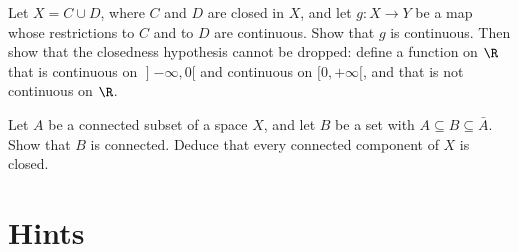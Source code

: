 \begin{exercise}[$\star\star$]\label{ex:v7c03c}
Let $X=C\cup D$, where $C$ and $D$ are closed in $X$, and let $g:X\to Y$ be a map whose restrictions to $C$ and to $D$ are continuous. Show that $g$ is continuous. Then show that the closedness hypothesis cannot be dropped: define a function on $\R$ that is continuous on $\mathopen]-\infty,0[$ and continuous on $[0,+\infty[$, and that is not continuous on $\R$.
\end{exercise}

\begin{exercise}[$\star\star\star$]\label{ex:v7c03d}
Let $A$ be a connected subset of a space $X$, and let $B$ be a set with $A\subseteq B\subseteq\bar A$. Show that $B$ is connected. Deduce that every connected component of $X$ is closed.
\end{exercise}

\section{Hints}

